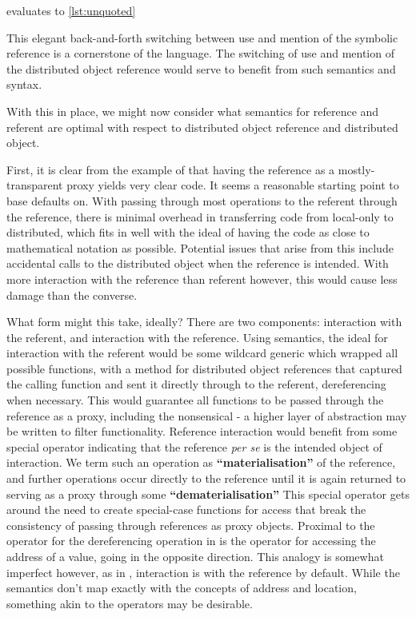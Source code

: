 
evaluates to \cref{lst:unquoted}


This elegant back-and-forth switching between use and mention of the symbolic reference is a cornerstone of the language.
The switching of use and mention of the distributed object reference would serve to benefit from such semantics and syntax.

With this in place, we might now consider what semantics for reference and referent are optimal with respect to distributed object reference and distributed object.

First, it is clear from the example of  that having the reference as a mostly-transparent proxy yields very clear code.
It seems a reasonable starting point to base defaults on.
With passing through most operations to the referent through the reference, there is minimal overhead in transferring code from local-only to distributed, which fits in well with the ideal of having the code as close to mathematical notation as possible.
Potential issues that arise from this include accidental calls to the distributed object when the reference is intended.
With more interaction with the reference than referent however, this would cause less damage than the converse.

What form might this take, ideally?
There are two components: interaction with the referent, and interaction with the reference.
Using \R{} semantics, the ideal for interaction with the referent would be some wildcard generic which wrapped all possible functions, with a method for distributed object references that captured the calling function and sent it directly through to the referent, dereferencing when necessary.
This would guarantee all functions to be passed through the reference as a proxy, including the nonsensical - a higher layer of abstraction may be written to filter functionality.
Reference interaction would benefit from some special operator indicating that the reference \emph{per se} is the intended object of interaction.
We term such an operation as \textbf{``materialisation''} of the reference, and further operations occur directly to the reference until it is again returned to serving as a proxy through some \textbf{``dematerialisation''} This special operator gets around the need to create special-case functions for access that break the consistency of passing through references as proxy objects.
Proximal to the  operator for the dereferencing operation in  is the  operator for accessing the address of a value, going in the opposite direction.
This analogy is somewhat imperfect however, as in , interaction is with the reference by default.
While the semantics don't map exactly with the concepts of address and location, something akin to the operators may be desirable.

